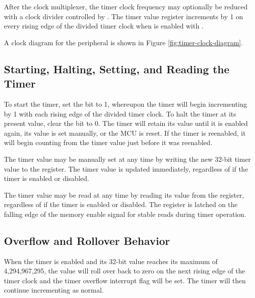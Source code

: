 After the clock multiplexer, the timer clock frequency may optionally be reduced with a clock divider controlled by . The timer value register  increments by 1 on every rising edge of the divided timer clock when  is enabled with .

A clock diagram for the  peripheral is shown in Figure \ref{fig:timer-clock-diagram}.



\subsection{Starting, Halting, Setting, and Reading the Timer}

To start the timer, set the  bit to 1, whereupon the timer will begin incrementing by 1 with each rising edge of the divided timer clock. To halt the timer at its present value, clear the  bit to 0. The timer will retain its value until it is enabled again, its value is set manually, or the MCU is reset. If the timer is reenabled, it will begin counting from the timer value just before it was reenabled.

The timer value may be manually set at any time by writing the new 32-bit timer value to the  register. The timer value is updated immediately, regardless of if the timer is enabled or disabled.

The timer value may be read at any time by reading its value from the  register, regardless of if the timer is enabled or disabled. The  register is latched on the falling edge of the memory enable signal for stable reads during timer operation.



\subsection{Overflow and Rollover Behavior}

When the timer is enabled and its 32-bit value reaches its maximum of 4,294,967,295, the value will roll over back to zero on the next rising edge of the timer clock and the timer overflow interrupt flag  will be set. The timer will then continue incrementing as normal.

